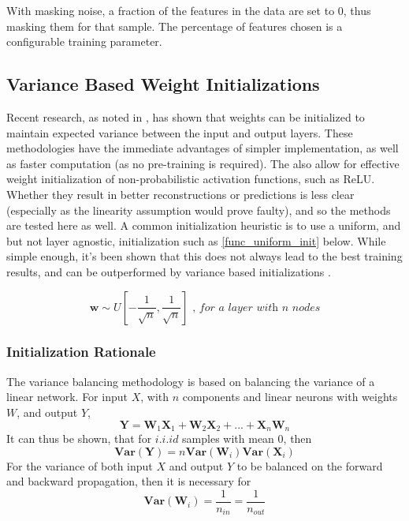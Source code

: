 \documentclass[a4paper,11pt,oneside]{article}
\theoremstyle{plain}
\theoremstyle{definition}
\begin{document}
	With masking noise, a fraction of the features in the data are set to 0, thus masking them for that sample. The percentage of features chosen is a configurable training parameter.
	
	\subsection{Variance Based Weight Initializations}\label{imp_weights}
	
	Recent research, as noted in \cite{He}, has shown that weights can be initialized to maintain expected variance between the input and output layers. These methodologies have the immediate advantages of simpler implementation, as well as faster computation (as no pre-training is required). The also allow for effective weight initialization of non-probabilistic activation functions, such as ReLU. Whether they result in better reconstructions or predictions is less clear (especially as the linearity assumption would prove faulty), and so the methods are tested here as well. 
	\newline\newline
	A common initialization heuristic is to use a uniform, and but not layer agnostic, initialization such as \ref{func_uniform_init} below. While simple enough, it's been shown that this does not always lead to the best training results, and can be outperformed by variance based initializations \cite{Glorot}.
	
	\begin{equation}\label{func_uniform_init}
	\mathbf{w} \sim U\left[-\frac{1}{\sqrt{n}}, \frac{1}{\sqrt{n}}\right] \textit{ , for a layer with n nodes}
	\end{equation}
	
	\subsubsection{Initialization Rationale}
	
	The variance balancing methodology is based on balancing the variance of a linear network. For input $X$, with $n$ components and linear neurons with weights $W$, and output $Y$,
	\begin{equation}
	\mathbf{Y} = \mathbf{W}_1\mathbf{X}_1 + \mathbf{W}_2\mathbf{X}_2 + ... + \mathbf{X}_n\mathbf{W}_n
	\end{equation}
	It can thus be shown, that for $i.i.id$ samples with mean $0$, then
	\begin{equation}
	\mathbf{Var(Y)} = n\mathbf{Var}(\mathbf{W}_i)\mathbf{Var}(\mathbf{X}_i)
	\end{equation}
	For the variance of both input $X$ and output $Y$ to be balanced on the forward and backward propagation, then it is necessary for
	\begin{equation}
	\mathbf{Var}(\mathbf{W}_i) = \frac{1}{n_{in}}= \frac{1}{n_{out}}
	\end{equation}
	
\end{document}
